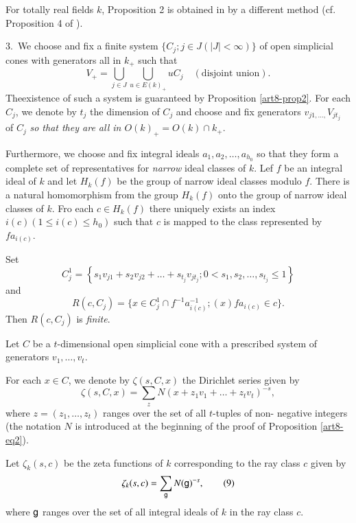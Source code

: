 \begin{remark*}
For totally real fields $k$, Proposition 2 is obtained in \cite{art8-1} by a different method (cf. Proposition 4 of \cite{art8-1}).
\end{remark*}

3.~We choose and fix a finite system $\{C_j ; j \in J (|J| < \infty)\}$ of open simplicial cones with generators all in $k_+$ such that 
\begin{equation}
V_+ = \bigcup\limits_{j \in J} \bigcup\limits_{u \in E (k)_+} u C_j \quad (\text{disjoint union}). \tag{7} \label{art8-eq7}
\end{equation}
The\pageoriginale existence of such a system is guaranteed by Proposition \ref{art8-prop2}. For each $C_j$, we denote by $t_j$ the dimension of $C_j$ and choose and fix generators $v_{j1, \ldots, } V_{jt_j}$ of $C_j$ \textit{so that they are all in $O(k)_+ = O(k) \cap k_+$}.

Furthermore, we choose and fix integral ideals $a_1, a_2, \ldots, a_{h_0}$ so that they form a complete set of representatives for \textit{narrow} ideal classes of $k$. Lef $f$ be an integral ideal of $k$ and let $H_k(f)$ be the group of narrow ideal classes modulo $f$. There is a natural homomorphism from the group $H_k(f)$ onto the group of narrow ideal classes of $k$. Fro each $c \in H_k(f)$ there uniquely exists an index $i(c) (1 \leqslant i (c) \leqslant h_0)$ such that $c$ is mapped to the class represented by $fa_{i(c)}$.

Set
$$
C^1_j = \left\{s_1 v_{j1} + s_2 v_{j2} + \ldots + s_{t_j} v_{jt_j} ; 0 < s_1, s_2 , \ldots, s_{t_j} \leqslant 1 \right\}
$$
and
$$
R(c, C_j) = \{x \in C^1_j \cap f^{-1} a^{-1}_{i(c)} ;(x) fa_{i(c)} \in c\}.
$$
Then $R(c,C_j)$ is \textit{finite}.

Let $C$ be a $t$-dimensional open simplicial cone with a prescribed system of generators $v_1, \ldots, v_t$.

For each $x \in C$, we denote by $\zeta (s, C,x)$ the Dirichlet series given by
\begin{equation*}
\zeta (s, C, x) = \sum\limits_z N (x + z_1 v_1+ \ldots + z_t v_t )^{-s},\tag{8} \label{art8-eq8}
\end{equation*}
where $z = (z_1, \ldots, z_t)$ ranges over the set of all $t$-tuples of non- negative integers (the notation $N$ is introduced at the beginning of the proof of Proposition \ref{art8-eq2}).

Let $\zeta_k(s,c)$ be the zeta functions of $k$ corresponding to the ray class $c$ given by
\begin{equation*}
\zeta_k (s,c) = \sum\limits_{\mathsf{g}} N (\mathsf{g})^{-s}, \tag{9}\label{art8-eq9}
\end{equation*}
where $\mathsf{g}$ ranges over the set of all integral ideals of $k$ in the ray class $c$.

